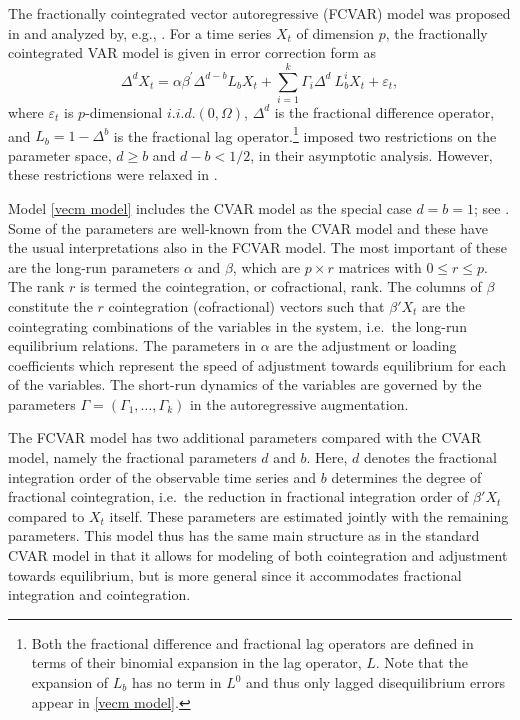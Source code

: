 \documentclass[10pt]{article}
\begin{document}
The fractionally cointegrated vector autoregressive (FCVAR) model was proposed in \cite{Johansen2008} and analyzed by, e.g., \cite{johniel2010,johansen2012likelihood}. For a time series $X_{t}$ of dimension $p$, the fractionally cointegrated VAR model is given in error correction form as
\begin{equation}
\Delta^{d}X_{t}= \alpha \beta^{\prime} \Delta^{d-b} L_{b} X_{t} + 
\sum_{i=1}^{k}\Gamma_{i}\Delta^{d}\ L_{b}^{i}X_{t}
+ \varepsilon_{t},
\label{vecm model}%
\end{equation}
where $\varepsilon_{t}$ is $p$-dimensional $i.i.d.(0,\Omega)$, $\Delta^{d}$ is the fractional difference operator, and $L_{b}=1-\Delta^{b}$ is the fractional lag operator.\footnote{Both the fractional difference and fractional lag operators are defined in terms of their binomial expansion in the lag operator, $L$. Note that the expansion of $L_{b}$ has no term in $L^{0}$ and thus only lagged disequilibrium errors appear in \eqref{vecm model}.} \cite{johansen2012likelihood} imposed two restrictions on the parameter space, $d\geq b$ and $d-b<1/2$, in their asymptotic analysis. However, these restrictions were relaxed in \cite{JN2018b,JN2018}.

Model \eqref{vecm model} includes the \cite{Johansen1995} CVAR model as the special case $d=b=1$; see \cite{JN2018}. Some of the parameters are well-known from the CVAR model and these have the usual interpretations also in the FCVAR model. The most important of these are the long-run parameters $\alpha$ and $\beta$, which are $p \times r$ matrices with $0 \leq r \leq p$. The rank $r$ is termed the cointegration, or cofractional, rank. The columns of $\beta$ constitute the $r$ cointegration (cofractional) vectors such that $\beta' X_t$ are the cointegrating combinations of the variables in the system, i.e.\ the long-run equilibrium relations. The parameters in $\alpha$ are the adjustment or loading coefficients which represent the speed of adjustment towards equilibrium for each of the variables. The short-run dynamics of the variables are governed by the parameters $\Gamma=(\Gamma _{1},\ldots ,\Gamma _{k})$ in the autoregressive augmentation.

The FCVAR model has two additional parameters compared with the CVAR model, namely the fractional parameters $d$ and $b$. Here, $d$ denotes the fractional integration order of the observable time series and $b$ determines the degree of fractional cointegration, i.e.\ the reduction in fractional integration order of $\beta'X_t$ compared to $X_t$ itself. These parameters are estimated jointly with the remaining parameters. This model thus has the same main structure as in the standard CVAR model in that it allows for modeling of both cointegration and adjustment towards equilibrium, but is more general since it accommodates fractional integration and cointegration.
\end{document}
